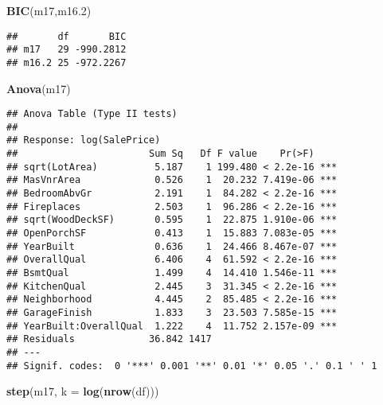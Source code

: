 \documentclass[
]{article}
\newenvironment{Shaded}{\begin{snugshade}}{\end{snugshade}}
\newcommand{\AttributeTok}[1]{\textcolor[rgb]{0.13,0.29,0.53}{#1}}
\newcommand{\FloatTok}[1]{\textcolor[rgb]{0.00,0.00,0.81}{#1}}
\newcommand{\FunctionTok}[1]{\textcolor[rgb]{0.13,0.29,0.53}{\textbf{#1}}}
\newcommand{\NormalTok}[1]{#1}
\begin{document}
\begin{Shaded}
\begin{Highlighting}[]
\FunctionTok{BIC}\NormalTok{(m17,m16}\FloatTok{.2}\NormalTok{)}
\end{Highlighting}
\end{Shaded}

\begin{verbatim}
##       df       BIC
## m17   29 -990.2812
## m16.2 25 -972.2267
\end{verbatim}

\begin{Shaded}
\begin{Highlighting}[]
\FunctionTok{Anova}\NormalTok{(m17)}
\end{Highlighting}
\end{Shaded}

\begin{verbatim}
## Anova Table (Type II tests)
## 
## Response: log(SalePrice)
##                       Sum Sq   Df F value    Pr(>F)    
## sqrt(LotArea)          5.187    1 199.480 < 2.2e-16 ***
## MasVnrArea             0.526    1  20.232 7.419e-06 ***
## BedroomAbvGr           2.191    1  84.282 < 2.2e-16 ***
## Fireplaces             2.503    1  96.286 < 2.2e-16 ***
## sqrt(WoodDeckSF)       0.595    1  22.875 1.910e-06 ***
## OpenPorchSF            0.413    1  15.883 7.083e-05 ***
## YearBuilt              0.636    1  24.466 8.467e-07 ***
## OverallQual            6.406    4  61.592 < 2.2e-16 ***
## BsmtQual               1.499    4  14.410 1.546e-11 ***
## KitchenQual            2.445    3  31.345 < 2.2e-16 ***
## Neighborhood           4.445    2  85.485 < 2.2e-16 ***
## GarageFinish           1.833    3  23.503 7.585e-15 ***
## YearBuilt:OverallQual  1.222    4  11.752 2.157e-09 ***
## Residuals             36.842 1417                      
## ---
## Signif. codes:  0 '***' 0.001 '**' 0.01 '*' 0.05 '.' 0.1 ' ' 1
\end{verbatim}

\begin{Shaded}
\begin{Highlighting}[]
\FunctionTok{step}\NormalTok{(m17, }\AttributeTok{k =} \FunctionTok{log}\NormalTok{(}\FunctionTok{nrow}\NormalTok{(df)))}
\end{Highlighting}
\end{Shaded}
\end{document}
